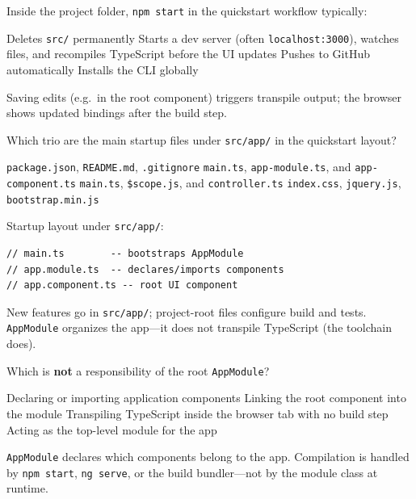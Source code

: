 \question[4]
Inside the project folder, \texttt{npm start} in the quickstart workflow typically:
\begin{choices}
  \choice Deletes \texttt{src/} permanently
  \CorrectChoice Starts a dev server (often \texttt{localhost:3000}), watches files, and recompiles TypeScript before the UI updates
  \choice Pushes to GitHub automatically
  \choice Installs the CLI globally
\end{choices}
\begin{solution}
  Saving edits (e.g.\ in the root component) triggers transpile output; the browser shows updated bindings after the build step.
\end{solution}

\question[4]
Which trio are the main startup files under \texttt{src/app/} in the quickstart layout?
\begin{choices}
  \choice \texttt{package.json}, \texttt{README.md}, \texttt{.gitignore}
  \CorrectChoice \texttt{main.ts}, \texttt{app-module.ts}, and \texttt{app-component.ts}
  \choice \texttt{main.ts}, \texttt{\$scope.js}, and \texttt{controller.ts}
  \choice \texttt{index.css}, \texttt{jquery.js}, \texttt{bootstrap.min.js}
\end{choices}
\begin{solution}
  Startup layout under \lstinline[style=bashinline]{src/app/}:
\begin{lstlisting}[style=ts]
// main.ts        -- bootstraps AppModule
// app.module.ts  -- declares/imports components
// app.component.ts -- root UI component
\end{lstlisting}
  New features go in \lstinline[style=bashinline]{src/app/}; project-root files configure build and tests. \lstinline[style=tsinline]{AppModule} organizes the app---it does not transpile TypeScript (the toolchain does).
\end{solution}

\question[4]
Which is \textbf{not} a responsibility of the root \texttt{AppModule}?
\begin{choices}
  \choice Declaring or importing application components
  \choice Linking the root component into the module
  \CorrectChoice Transpiling TypeScript inside the browser tab with no build step
  \choice Acting as the top-level module for the app
\end{choices}
\begin{solution}
  \lstinline[style=tsinline]{AppModule} declares which components belong to the app. Compilation is handled by \lstinline[style=bashinline]{npm start}, \lstinline[style=bashinline]{ng serve}, or the build bundler---not by the module class at runtime.
\end{solution}

